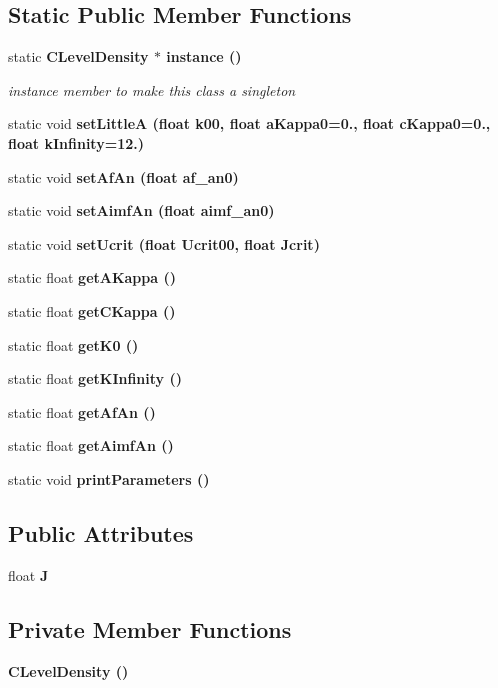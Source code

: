 \subsection*{Static Public Member Functions}
\begin{CompactItemize}
\item 
static \bf{CLevel\-Density} $\ast$ \bf{instance} ()\label{classCLevelDensity_fe25e210704d8333f87261835305e5a3}

\begin{CompactList}\small\item\em instance member to make this class a singleton \item\end{CompactList}\item 
static void \bf{set\-Little\-A} (float k00, float a\-Kappa0=0., float c\-Kappa0=0., float \bf{k\-Infinity}=12.)
\item 
static void \bf{set\-Af\-An} (float af\_\-an0)
\item 
static void \bf{set\-Aimf\-An} (float aimf\_\-an0)
\item 
static void \bf{set\-Ucrit} (float Ucrit00, float \bf{Jcrit})
\item 
static float \bf{get\-AKappa} ()
\item 
static float \bf{get\-CKappa} ()
\item 
static float \bf{get\-K0} ()
\item 
static float \bf{get\-KInfinity} ()
\item 
static float \bf{get\-Af\-An} ()
\item 
static float \bf{get\-Aimf\-An} ()
\item 
static void \bf{print\-Parameters} ()
\end{CompactItemize}
\subsection*{Public Attributes}
\begin{CompactItemize}
\item 
float \textbf{J}\label{classCLevelDensity_dcfcf4e3e8ba27e33089c592ef593d8a}

\end{CompactItemize}
\subsection*{Private Member Functions}
\begin{CompactItemize}
\item 
\bf{CLevel\-Density} ()
\end{CompactItemize}
